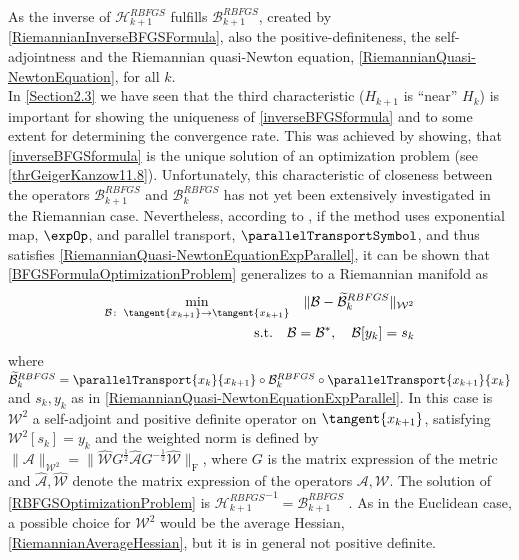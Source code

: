 As the inverse of $\mathcal{H}^{RBFGS}_{k+1}$ fulfills $\mathcal{B}^{RBFGS}_{k+1}$, created by \cref{RiemannianInverseBFGSFormula}, also the positive-definiteness, the self-adjointness and the Riemannian quasi-Newton equation, \cref{RiemannianQuasi-NewtonEquation}, for all $k$. \\
In \cref{Section2.3} we have seen that the third characteristic ($H_{k+1}$ is “near” $H_k$) is important for showing the uniqueness of \cref{inverseBFGSformula} and to some extent for determining the convergence rate. This was achieved by showing, that \cref{inverseBFGSformula} is the unique solution of an optimization problem (see \cref{thrGeigerKanzow11.8}). Unfortunately, this characteristic of closeness between the operators $\mathcal{B}^{RBFGS}_{k+1}$ and $\mathcal{B}^{RBFGS}_k$ has not yet been extensively investigated in the Riemannian case. Nevertheless, according to \cite{Huang:2013}, if the method uses exponential map, $\expOp$, and parallel transport, $\parallelTransportSymbol$, and thus satisfies \cref{RiemannianQuasi-NewtonEquationExpParallel}, it can be shown that \cref{BFGSFormulaOptimizationProblem} generalizes to a Riemannian manifold as
\begin{equation}\label{RBFGSOptimizationProblem}
    \begin{aligned}
        \min_{\mathcal{B} \colon \; \tangent{x_{k+1}} \to \tangent{x_{k+1}}} \quad  \lVert \mathcal{B} - \widetilde{\mathcal{B}}^{RBFGS}_k \rVert_{\mathcal{W}^2} \\
        \textrm{s.t.} \quad \mathcal{B} = \mathcal{B}^{*}, \quad \mathcal{B}[y_k] = s_k 
    \end{aligned}
\end{equation}
where $\widetilde{\mathcal{B}}^{RBFGS}_k = \parallelTransport{x_k}{x_{k+1}} \circ \mathcal{B}^{RBFGS}_k \circ \parallelTransport{x_{k+1}}{x_k}$ and $s_k, y_k$ as in \cref{RiemannianQuasi-NewtonEquationExpParallel}. In this case is $\mathcal{W}^2$ a self-adjoint and positive definite operator on $\tangent{x_{k+1}}$, satisfying $\mathcal{W}^2[s_k] = y_k$ and the weighted norm is defined by $\lVert \mathcal{A} \rVert_{\mathcal{W}^2} = \lVert \hat{\mathcal{W}} G^{\frac{1}{2}} \hat{\mathcal{A}} G^{-\frac{1}{2}} \hat{\mathcal{W}} \rVert_{\mathrm{F}}$, where $G$ is the matrix expression of the metric and $\hat{\mathcal{A}},\hat{\mathcal{W}}$ denote the matrix expression of the operators $\mathcal{A}, \mathcal{W}$. The solution of \cref{RBFGSOptimizationProblem} is ${\mathcal{H}^{RBFGS}_{k+1}}^{-1} = \mathcal{B}^{RBFGS}_{k+1}$ \cite[p.~19]{Huang:2013}. As in the Euclidean case, a possible choice for ${\mathcal{W}}^2$ would be the average Hessian, \cref{RiemannianAverageHessian}, but it is in general not positive definite. \\
